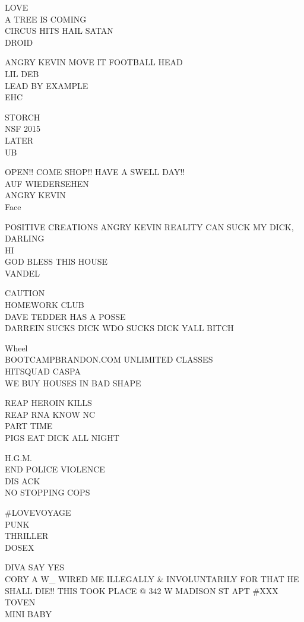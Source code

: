 \documentclass[10pt,letterpaper]{article}
\begin{document}
LOVE\\
A TREE IS COMING\\
CIRCUS HITS HAIL SATAN\\
DROID

ANGRY KEVIN MOVE IT FOOTBALL HEAD\\
LIL DEB\\
LEAD BY EXAMPLE\\
EHC

STORCH\\
NSF 2015\\
LATER\\
UB

OPEN!! COME SHOP!! HAVE A SWELL DAY!!\\
AUF WIEDERSEHEN\\
ANGRY KEVIN\\
Face

POSITIVE CREATIONS ANGRY KEVIN REALITY CAN SUCK MY DICK, DARLING\\
HI\\
GOD BLESS THIS HOUSE\\
VANDEL

CAUTION\\
HOMEWORK CLUB\\
DAVE TEDDER HAS A POSSE\\
DARREIN SUCKS DICK WDO SUCKS DICK YALL BITCH

Wheel\\
BOOTCAMPBRANDON.COM UNLIMITED CLASSES\\
HITSQUAD CASPA\\
WE BUY HOUSES IN BAD SHAPE

REAP HEROIN KILLS\\
REAP RNA KNOW NC\\
PART TIME\\
PIGS EAT DICK ALL NIGHT

H.G.M.\\
END POLICE VIOLENCE\\
DIS ACK\\
NO STOPPING COPS

\#LOVEVOYAGE\\
PUNK\\
THRILLER\\
DOSEX

DIVA SAY YES\\
CORY A W\_ WIRED ME ILLEGALLY \& INVOLUNTARILY FOR THAT HE SHALL DIE!! THIS TOOK PLACE @ 342 W MADISON ST APT \#XXX\\
TOVEN\\
MINI BABY
\end{document}
